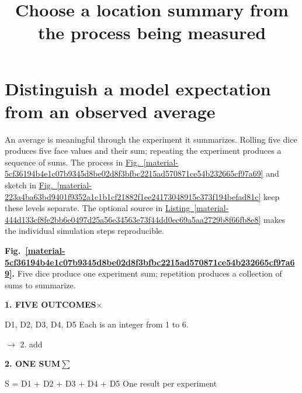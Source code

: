 \documentclass[11pt,a4paper]{article}
\begin{document}
\title{Choose a location summary from the process being measured}
\author{}
\date{}
\maketitle
\tableofcontents
\clearpage
\section{Distinguish a model expectation from an observed average}
An average is meaningful through the experiment it summarizes. Rolling five dice produces five face values and their sum; repeating the experiment produces a sequence of sums. The process in \hyperref[material-5cf36194b4e1c07b9345d8be02d8f3bfbc2215ad570871ce54b232665cf97a69]{Fig.~\ref*{material-5cf36194b4e1c07b9345d8be02d8f3bfbc2215ad570871ce54b232665cf97a69}} and sketch in \hyperref[material-223a4ba63bd9401f9352a1c1b1cf21882f1ee24173048915c373f194befad81c]{Fig.~\ref*{material-223a4ba63bd9401f9352a1c1b1cf21882f1ee24173048915c373f194befad81c}} keep these levels separate. The optional source in \hyperref[material-444d133cf8fe2bb6e0497d25a56e34563e73f44dd0ec69a5aa2729b8f66fb8e8]{Listing~\ref*{material-444d133cf8fe2bb6e0497d25a56e34563e73f44dd0ec69a5aa2729b8f66fb8e8}} makes the individual simulation steps reproducible.


\par\medskip
\Needspace{10cm}
\label{material-5cf36194b4e1c07b9345d8be02d8f3bfbc2215ad570871ce54b232665cf97a69}
\noindent\textbf{Fig.~\ref*{material-5cf36194b4e1c07b9345d8be02d8f3bfbc2215ad570871ce54b232665cf97a69}.} Five dice produce one experiment sum; repetition produces a collection of sums to summarize.\par\nopagebreak
\par\medskip\noindent\textcolor{pcd1}{\textbf{1. FIVE OUTCOMES}}\ensuremath{\times}\par
D1, D2, D3, D4, D5
Each is an integer from 1 to 6.

\par\noindent $\longrightarrow$ 2. add
\par\medskip\noindent\textcolor{pcd2}{\textbf{2. ONE SUM}}\quad \ensuremath{\sum}\par
S = D1 + D2 + D3 + D4 + D5
One result per experiment


\medskip
\end{document}

